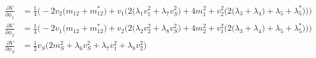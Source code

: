 \begin{align} 
\frac{\partial V}{\partial \phi_1} &= \frac{1}{4} \Big(-2 v_2 \Big(m_{12} + m_{12}^*\Big) + v_1 \Big(2 \Big(\lambda_1 v_{1}^{2}  + \lambda_7 v_{S}^{2} \Big) + 4 m^2_1  + v_{2}^{2} \Big(2 \Big(\lambda_3 + \lambda_4\Big) + \lambda_5 + \lambda_5^*\Big)\Big)\Big)\\ 
\frac{\partial V}{\partial \phi_2} &= \frac{1}{4} \Big(-2 v_1 \Big(m_{12} + m_{12}^*\Big) + v_2 \Big(2 \Big(\lambda_2 v_{2}^{2}  + \lambda_8 v_{S}^{2} \Big) + 4 m^2_2  + v_{1}^{2} \Big(2 \Big(\lambda_3 + \lambda_4\Big) + \lambda_5 + \lambda_5^*\Big)\Big)\Big)\\ 
\frac{\partial V}{\partial \phi_S} &= \frac{1}{2} v_S \Big(2 m_S^2  + \lambda_6 v_{S}^{2}  + \lambda_7 v_{1}^{2}  + \lambda_8 v_{2}^{2} \Big)
\end{align} 

